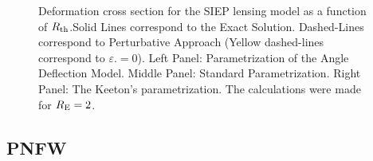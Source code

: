 \begin{figure}[!ht]
{}
\caption{\label{dcs_siep_rth_pm} Deformation cross section for the  SIEP lensing
model as a function of $R_{\rm th}$.Solid Lines correspond to the Exact
Solution. Dashed-Lines correspond to Perturbative Approach (Yellow dashed-lines 
correspond to $\varepsilon.=0$). Left Panel:
Parametrization of the Angle Deflection Model. Middle Panel: Standard
Parametrization. Right Panel: The Keeton's parametrization. The calculations
were
made for $R_{\rm E}=2$.}
\end{figure}




\subsection{PNFW}

